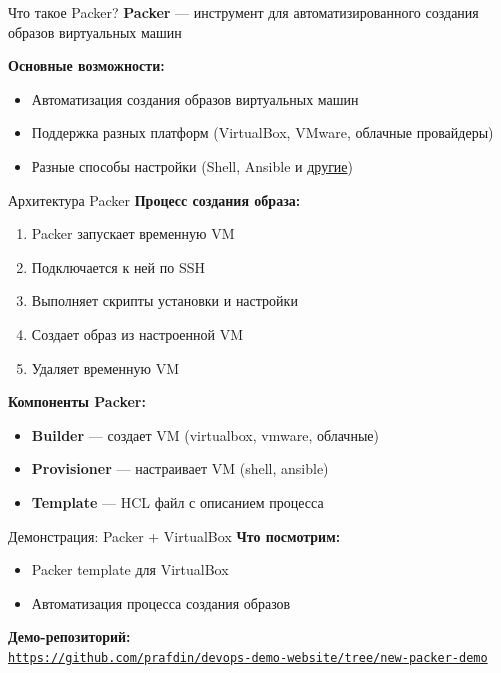 \documentclass[aspectratio=169]{beamer}
\begin{document}
    \begin{frame}{Что такое Packer?}
        \textbf{Packer} — инструмент для автоматизированного создания образов виртуальных машин
        
        \vspace{0.5cm}
        
        \textbf{Основные возможности:}
        \begin{itemize}
            \item Автоматизация создания образов виртуальных машин
            \item Поддержка разных платформ (VirtualBox, VMware, облачные провайдеры)
            \item Разные способы настройки (Shell, Ansible и \href{https://developer.hashicorp.com/packer/integrations}{другие})
        \end{itemize}
    \end{frame}

    \begin{frame}{Архитектура Packer}
        \textbf{Процесс создания образа:}
        
        \begin{enumerate}
            \item Packer запускает временную VM
            \item Подключается к ней по SSH
            \item Выполняет скрипты установки и настройки
            \item Создает образ из настроенной VM
            \item Удаляет временную VM
        \end{enumerate}
        
        \vspace{0.5cm}
        
        \textbf{Компоненты Packer:}
        \begin{itemize}
            \item \textbf{Builder} — создает VM (virtualbox, vmware, облачные)
            \item \textbf{Provisioner} — настраивает VM (shell, ansible)
            \item \textbf{Template} — HCL файл с описанием процесса
        \end{itemize}
    \end{frame}


    \begin{frame}{Демонстрация: Packer + VirtualBox}
        \textbf{Что посмотрим:}
        \begin{itemize}
            \item Packer template для VirtualBox
            \item Автоматизация процесса создания образов
        \end{itemize}

        \vspace{0.2cm}
        \textbf{Демо-репозиторий:} \\
        \href{https://github.com/prafdin/devops-demo-website/tree/new-packer-demo}{\texttt{https://github.com/prafdin/devops-demo-website/tree/new-packer-demo}}
    \end{frame}
\end{document}
